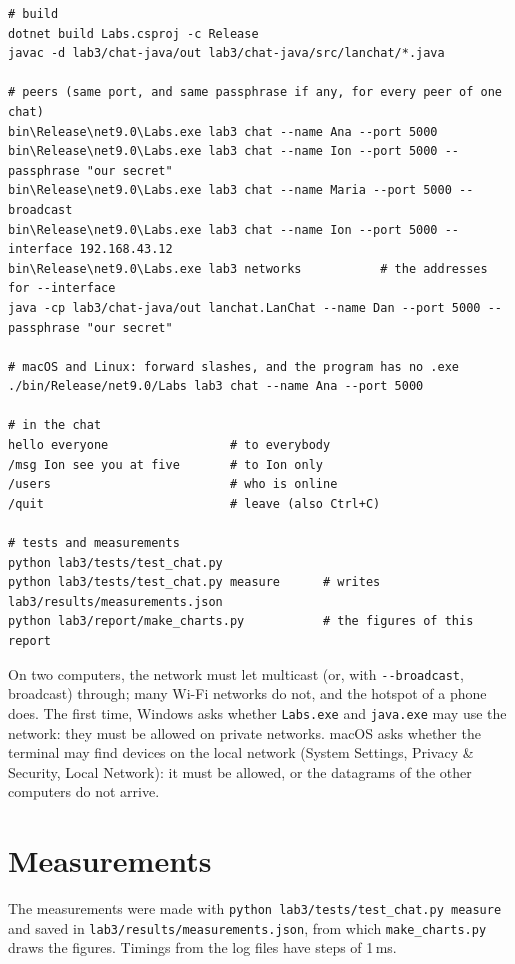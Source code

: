 \documentclass[11pt,a4paper]{article}
\newcommand{\code}[1]{{\frenchspacing\texttt{#1}}}
\begin{document}
\begin{lstlisting}
# build
dotnet build Labs.csproj -c Release
javac -d lab3/chat-java/out lab3/chat-java/src/lanchat/*.java

# peers (same port, and same passphrase if any, for every peer of one chat)
bin\Release\net9.0\Labs.exe lab3 chat --name Ana --port 5000
bin\Release\net9.0\Labs.exe lab3 chat --name Ion --port 5000 --passphrase "our secret"
bin\Release\net9.0\Labs.exe lab3 chat --name Maria --port 5000 --broadcast
bin\Release\net9.0\Labs.exe lab3 chat --name Ion --port 5000 --interface 192.168.43.12
bin\Release\net9.0\Labs.exe lab3 networks           # the addresses for --interface
java -cp lab3/chat-java/out lanchat.LanChat --name Dan --port 5000 --passphrase "our secret"

# macOS and Linux: forward slashes, and the program has no .exe
./bin/Release/net9.0/Labs lab3 chat --name Ana --port 5000

# in the chat
hello everyone                 # to everybody
/msg Ion see you at five       # to Ion only
/users                         # who is online
/quit                          # leave (also Ctrl+C)

# tests and measurements
python lab3/tests/test_chat.py
python lab3/tests/test_chat.py measure      # writes lab3/results/measurements.json
python lab3/report/make_charts.py           # the figures of this report
\end{lstlisting}

On two computers, the network must let multicast (or, with \code{-{}-broadcast}, broadcast) through;
many Wi-Fi networks do not, and the hotspot of a phone does. The first time, Windows asks whether
\code{Labs.exe} and \code{java.exe} may use the network: they must be allowed on private networks.
macOS asks whether the terminal may find devices on the local network (System Settings, Privacy
\& Security, Local Network): it must be allowed, or the datagrams of the other computers do not
arrive.

\section{Measurements}\label{app:data}

The measurements were made with \code{python lab3/tests/test\_chat.py measure} and saved in
\code{lab3/results/measurements.json}, from which \code{make\_charts.py} draws the figures. Timings
from the log files have steps of 1\,ms.
\end{document}
